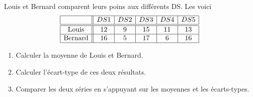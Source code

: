 
\begin{exercice}\label{exosmath-0246}

    Louis et Bernard comparent leurs poins aux différents DS. Les voici
    \begin{equation*}
        \begin{array}[]{|c||c|c|c|c|c|}
            \hline
            &DS1&DS2&DS3&DS4&DS5\\
            \hline\hline
            \text{Louis}&12&9&15&11&13\\
            \hline
            \text{Bernard}&16&5&17&6&16\\
            \hline
        \end{array}
    \end{equation*}
    
    \begin{enumerate}
        \item
            Calculer la moyenne de Louis et Bernard.
        \item
            Calculer l'écart-type de ces deux résultats.
        \item
            Comparer les deux séries en s'appuyant sur les moyennes et les écarts-types.
    \end{enumerate}

\end{exercice}
